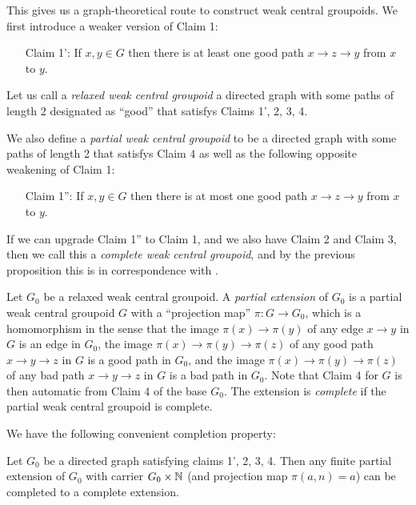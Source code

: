 This gives us a graph-theoretical route to construct weak central groupoids. We first introduce a weaker version of Claim 1:

\begin{itemize}
  \item[Claim 1':] If $x,y \in G$ then there is at least one good path $x \to z \to y$ from $x$ to $y$.
\end{itemize}

Let us call a \emph{relaxed weak central groupoid} a directed graph with some paths of length 2 designated as ``good'' that satisfys Claims 1', 2, 3, 4.

We also define a \emph{partial weak central groupoid} to be a directed graph with some paths of length 2 that satisfys Claim 4 as well as the following opposite weakening of Claim 1:

\begin{itemize}
  \item[Claim 1'':] If $x,y \in G$ then there is at most one good path $x \to z \to y$ from $x$ to $y$.
\end{itemize}

If we can upgrade Claim 1'' to Claim 1, and we also have Claim 2 and Claim 3, then we call this a \emph{complete weak central groupoid}, and by the previous proposition this is in correspondence with .

Let $G_0$ be a relaxed weak central groupoid. A \emph{partial extension} of $G_0$ is a partial weak central groupoid $G$ with a ``projection map'' $\pi: G \to G_0$, which is a homomorphism in the sense that the image $\pi(x) \to \pi(y)$ of any edge $x \to y$ in $G$ is an edge in $G_0$, the image $\pi(x) \to \pi(y) \to \pi(z)$ of any good path $x \to y \to z$ in $G$ is a good path in $G_0$, and the image $\pi(x) \to \pi(y) \to \pi(z)$ of any bad path $x \to y \to z$ in $G$ is a bad path in $G_0$. Note that Claim 4 for $G$ is then automatic from Claim 4 of the base $G_0$. The extension is \emph{complete} if the partial weak central groupoid is complete.

We have the following convenient completion property:

\begin{proposition}\label{greedy-prop}\leanok{}
  Let $G_0$ be a directed graph satisfying claims 1', 2, 3, 4. Then any finite partial extension of $G_0$ with carrier $G_0 \times \mathbb{N}$ (and projection map $\pi(a,n) = a$) can be completed to a complete extension.
\end{proposition}

